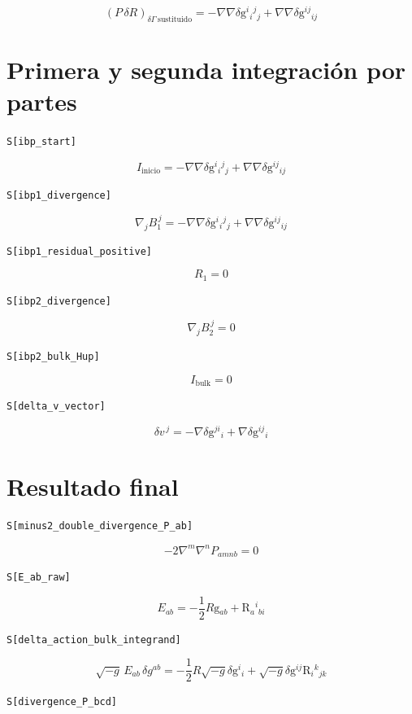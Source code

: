\documentclass[11pt,a4paper]{article}
\begin{document}
\[
\boxed{\left(P\,\delta R\right)_{\delta\Gamma\ \mathrm{sustituido}} = -\nabla\nabla\delta \mathrm{g}{}^{i}{}_{i}{}^{j}{}_{j} + \nabla\nabla\delta \mathrm{g}{}^{ij}{}_{ij}}
\]


\section*{Primera y segunda integración por partes}

\noindent\texttt{S[ibp\_start]}

\[
\boxed{I_{\mathrm{inicio}} = -\nabla\nabla\delta \mathrm{g}{}^{i}{}_{i}{}^{j}{}_{j} + \nabla\nabla\delta \mathrm{g}{}^{ij}{}_{ij}}
\]


\noindent\texttt{S[ibp1\_divergence]}

\[
\boxed{\nabla_j B_1^{\,j} = -\nabla\nabla\delta \mathrm{g}{}^{i}{}_{i}{}^{j}{}_{j} + \nabla\nabla\delta \mathrm{g}{}^{ij}{}_{ij}}
\]


\noindent\texttt{S[ibp1\_residual\_positive]}

\[
\boxed{R_1 = 0}
\]


\noindent\texttt{S[ibp2\_divergence]}

\[
\boxed{\nabla_j B_2^{\,j} = 0}
\]


\noindent\texttt{S[ibp2\_bulk\_Hup]}

\[
\boxed{I_{\mathrm{bulk}} = 0}
\]


\noindent\texttt{S[delta\_v\_vector]}

\[
\boxed{\delta v^{\,j} = -\nabla\delta \mathrm{g}{}^{ji}{}_{i} + \nabla\delta \mathrm{g}{}^{ij}{}_{i}}
\]


\section*{Resultado final}

\noindent\texttt{S[minus2\_double\_divergence\_P\_ab]}

\[
\boxed{-2\nabla^m\nabla^n P_{amnb} = 0}
\]


\noindent\texttt{S[E\_ab\_raw]}

\[
\boxed{E_{ab} = -\frac{1}{2}R\mathrm{g}{}_{ab} + \mathrm{R}{}_{a}{}^{i}{}_{bi}}
\]


\noindent\texttt{S[delta\_action\_bulk\_integrand]}

\[
\boxed{\sqrt{-g}\,E_{ab}\,\delta g^{ab} = -\frac{1}{2}R\sqrt{-g}\delta \mathrm{g}{}^{i}{}_{i} + \sqrt{-g}\delta \mathrm{g}{}^{ij}\mathrm{R}{}_{i}{}^{k}{}_{jk}}
\]


\noindent\texttt{S[divergence\_P\_bcd]}
\end{document}
